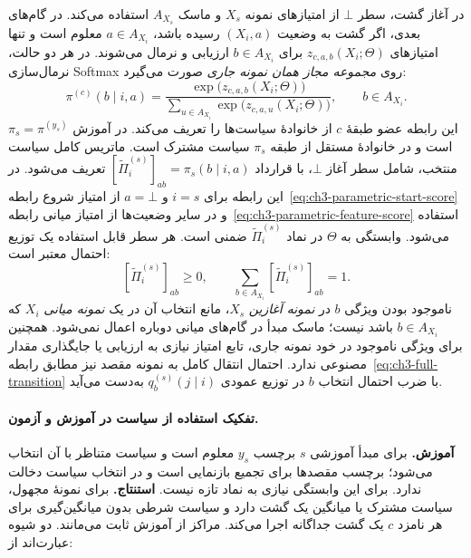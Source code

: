 در آغاز گشت، سطر $\bot$ از امتیازهای نمونه $X_s$ و ماسک
$A_{X_s}$ استفاده می‌کند. در گام‌های بعدی، اگر گشت به وضعیت
$(X_i,a)$ رسیده باشد، $a\in A_{X_i}$ معلوم است و تنها
امتیازهای $z_{c,a,b}(X_i;\Theta)$ برای $b\in A_{X_i}$
ارزیابی و نرمال می‌شوند. در هر دو حالت، نرمال‌سازی Softmax روی
\emph{مجموعه مجاز همان نمونه جاری} صورت می‌گیرد:
\begin{equation}\label{eq:ch3-fixed-policy-softmax}
\boxed{
\pi^{(c)}(b\mid i,a)
=\frac{\exp\bigl(z_{c,a,b}(X_i;\Theta)\bigr)}
{\sum\limits_{u\in A_{X_i}}
\exp\bigl(z_{c,a,u}(X_i;\Theta)\bigr)},
\qquad b\in A_{X_i}.
}
\end{equation}
این رابطه عضو طبقهٔ $c$ از خانوادهٔ
سیاست‌ها را تعریف می‌کند. در آموزش
$\pi_s=\pi^{(y_s)}$ است و در خانوادهٔ
مستقل از طبقه $\pi_s$ سیاست مشترک است.
ماتریس کامل سیاست منتخب، شامل سطر
آغاز $\bot$، با قرارداد
$[\widetilde\Pi_i^{(s)}]_{ab}=\pi_s(b\mid i,a)$
تعریف می‌شود.
در این رابطه برای $i=s$ و $a=\bot$ از امتیاز شروع
رابطه~\eqref{eq:ch3-parametric-start-score} و در سایر وضعیت‌ها
از امتیاز میانی رابطه~\eqref{eq:ch3-parametric-feature-score}
استفاده می‌شود. وابستگی به $\Theta$ در نماد $\widetilde\Pi_i^{(s)}$
ضمنی است. هر سطر قابل استفاده یک توزیع احتمال معتبر است:
\begin{equation}\label{eq:ch3-policy-stochastic}
[\widetilde\Pi_i^{(s)}]_{ab}\ge0,\qquad
\sum_{b\in A_{X_i}}[\widetilde\Pi_i^{(s)}]_{ab}=1.
\end{equation}
ناموجود بودن ویژگی $b$ در \emph{نمونه آغازین} $X_s$، مانع
انتخاب آن در یک \emph{نمونه میانی} $X_i$ که $b\in A_{X_i}$
باشد نیست؛ ماسک مبدأ در گام‌های میانی دوباره اعمال نمی‌شود.
همچنین برای ویژگی ناموجود در خود نمونه جاری، تابع امتیاز نیازی
به ارزیابی یا جایگذاری مقدار مصنوعی ندارد. احتمال انتقال کامل
به نمونه مقصد نیز مطابق رابطه~\eqref{eq:ch3-full-transition}
با ضرب احتمال انتخاب $b$ در توزیع عمودی $q_b^{(s)}(j\mid i)$
به‌دست می‌آید.

\paragraph{تفکیک استفاده از سیاست در آموزش و آزمون.}
\textbf{آموزش.} برای مبدأ آموزشی $s$ برچسب
$y_s$ معلوم است و سیاست متناظر با آن انتخاب
می‌شود؛ برچسب مقصدها برای تجمیع بازنمایی
است و در انتخاب سیاست دخالت ندارد. برای
این وابستگی نیازی به نماد تازه نیست.
\textbf{استنتاج.} برای نمونهٔ مجهول، سیاست
مشترک یا میانگین یک گشت دارد و سیاست
شرطی بدون میانگین‌گیری برای هر نامزد $c$
یک گشت جداگانه اجرا می‌کند. مراکز از
آموزش ثابت می‌مانند. دو شیوه عبارت‌اند از:

